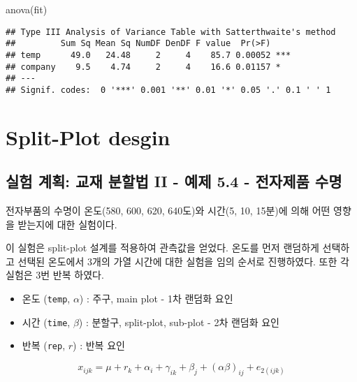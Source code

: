 \documentclass[
]{book}
\newenvironment{Shaded}{\begin{snugshade}}{\end{snugshade}}
\newcommand{\FunctionTok}[1]{\textcolor[rgb]{0.00,0.00,0.00}{#1}}
\newcommand{\NormalTok}[1]{#1}
\providecommand{\tightlist}{%
  \setlength{\itemsep}{0pt}\setlength{\parskip}{0pt}}
\begin{document}
\begin{Shaded}
\begin{Highlighting}[]
\FunctionTok{anova}\NormalTok{(fit)}
\end{Highlighting}
\end{Shaded}

\begin{verbatim}
## Type III Analysis of Variance Table with Satterthwaite's method
##         Sum Sq Mean Sq NumDF DenDF F value  Pr(>F)    
## temp      49.0   24.48     2     4    85.7 0.00052 ***
## company    9.5    4.74     2     4    16.6 0.01157 *  
## ---
## Signif. codes:  0 '***' 0.001 '**' 0.01 '*' 0.05 '.' 0.1 ' ' 1
\end{verbatim}

\hypertarget{ex54}{%
\chapter{Split-Plot desgin}\label{ex54}}

\hypertarget{uxc2e4uxd5d8-uxacc4uxd68d-uxad50uxc7ac-uxbd84uxd560uxbc95-ii---uxc608uxc81c-5.4---uxc804uxc790uxc81cuxd488-uxc218uxba85}{%
\section{실험 계획: 교재 분할법 II - 예제 5.4 - 전자제품 수명}\label{uxc2e4uxd5d8-uxacc4uxd68d-uxad50uxc7ac-uxbd84uxd560uxbc95-ii---uxc608uxc81c-5.4---uxc804uxc790uxc81cuxd488-uxc218uxba85}}

전자부품의 수명이 온도(580, 600, 620, 640도)와 시간(5, 10, 15분)에 의해 어떤 영향을 받는지에 대한 실험이다.

이 실험은 split-plot 설계를 적용하여 관측값을 얻었다. 온도를 먼저 랜덤하게 선택하고 선택된 온도에서 3개의 가열 시간에 대한 실험을 임의 순서로 진행하였다. 또한 각 실험은 3번 반복 하였다.

\begin{itemize}
\tightlist
\item
  온도 (\texttt{temp}, \(\alpha\)) : 주구, main plot - 1차 랜덤화 요인
\item
  시간 (\texttt{time}, \(\beta\)) : 분할구, split-plot, sub-plot - 2차 랜덤화 요인
\item
  반복 (\texttt{rep}, \(r\)) : 반복 요인
\end{itemize}

\begin{equation}
x_{ijk} = \mu + r_k + \alpha_i + \gamma_{ik} + \beta_j + (\alpha \beta)_{ij} + e_{2(ijk)} 
\label{eq:splitplot}
\end{equation}
\end{document}
